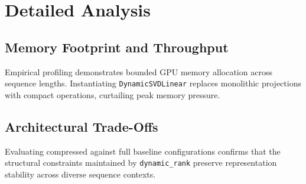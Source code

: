 \section{Detailed Analysis}

\subsection{Memory Footprint and Throughput}
Empirical profiling demonstrates bounded GPU memory allocation across sequence lengths. Instantiating \texttt{DynamicSVDLinear} replaces monolithic projections with compact operations, curtailing peak memory pressure.

\subsection{Architectural Trade-Offs}
Evaluating compressed against full baseline configurations confirms that the structural constraints maintained by \texttt{dynamic_rank} preserve representation stability across diverse sequence contexts.
